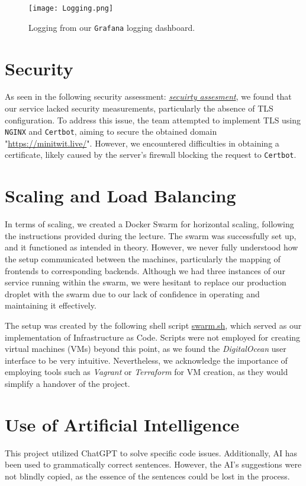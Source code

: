 \begin{sidewaysfigure}[H]
    \centering
    \texttt{[image: Logging.png]}
    \caption{Logging from our \texttt{Grafana} logging dashboard.}
    \label{fig:Minitwit_logging}
\end{sidewaysfigure}

\section{Security}

As seen in the following security assessment: \href{https://github.com/simonskodt/itu-minitwit/blob/main/Documents/SECURITY_ASSESSMENT.md}{\textit{secuirty assesment}}, we found that our service lacked security measurements, particularly the absence of TLS configuration. To address this issue, the team attempted to implement TLS using \texttt{NGINX} and \texttt{Certbot}, aiming to secure the obtained domain "\underline{https://minitwit.live/}". However, we encountered difficulties in obtaining a certificate, likely caused by the server's firewall blocking the request to \texttt{Certbot}.

\section{Scaling and Load Balancing}

In terms of scaling, we created a Docker Swarm for horizontal scaling, following the instructions provided during the lecture.  The swarm was successfully set up, and it functioned as intended in theory. However, we never fully understood how the setup communicated between the machines, particularly the mapping of frontends to corresponding backends. Although we had three instances of our service running within the swarm, we were hesitant to replace our production droplet with the swarm due to our lack of confidence in operating and maintaining it effectively. 

The setup was created by the following shell script \href{https://github.com/simonskodt/itu-minitwit/blob/feat-swarm/swarm.sh
}{swarm.sh}, which served as our implementation of Infrastructure as Code. Scripts were not employed for creating virtual machines (VMs) beyond this point, as we found the \textit{DigitalOcean} user interface to be very intuitive. Nevertheless, we acknowledge the importance of employing tools such as \textit{Vagrant} or \textit{Terraform} for VM creation, as they would simplify a handover of the project.

\section{Use of Artificial Intelligence} 

This project utilized ChatGPT to solve specific code issues. Additionally, AI has been used to grammatically correct sentences. However, the AI's suggestions were not blindly copied, as the essence of the sentences could be lost in the process.
